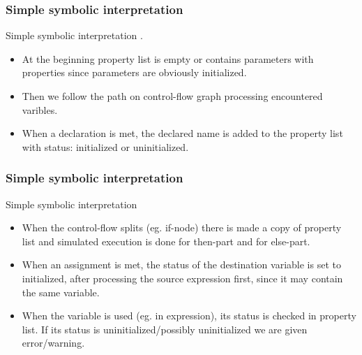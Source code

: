 \documentclass[presentation]{beamer}
\begin{document}
\begin{frame}
  \frametitle{Simple symbolic interpretation}
  
  \begin{block}{Simple symbolic interpretation}
  . 
  \begin{itemize}
    \item At the beginning property list is empty or contains parameters with properties since parameters are obviously initialized.
    \item Then we follow the path on control-flow graph processing encountered varibles.
    \item When a declaration is met, the declared name is added to the property list with status: initialized or uninitialized.
    
    \end{itemize}
 
  \end{block}
  
\end{frame}

\begin{frame}
  \frametitle{Simple symbolic interpretation}
  
  \begin{block}{Simple symbolic interpretation}
  \begin{itemize}
    \item When the control-flow splits (eg. if-node) there is made a copy of property list and simulated execution is done for then-part and for else-part.
    \item When an assignment is met, the status of the destination variable is set to
    initialized, after processing the source expression first, since it may contain the same
    variable.
    \item When the variable is used (eg. in expression), its status is checked in property list. If its status is uninitialized/possibly uninitialized we are given error/warning.
    \end{itemize}
 
  \end{block}
  
\end{frame}
\end{document}
